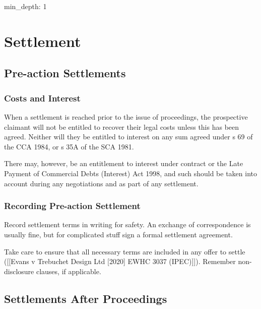 \documentclass[
]{article}
\author{}
\date{}
\newenvironment{Shaded}{}{}
\newcommand{\NormalTok}[1]{#1}
\begin{document}
{
\setcounter{tocdepth}{3}
\tableofcontents
}
\begin{Shaded}
\begin{Highlighting}[]
\NormalTok{min\_depth: 1}
\end{Highlighting}
\end{Shaded}

\hypertarget{settlement}{%
\section{Settlement}\label{settlement}}

\hypertarget{pre-action-settlements}{%
\subsection{Pre-action Settlements}\label{pre-action-settlements}}

\hypertarget{costs-and-interest}{%
\subsubsection{Costs and Interest}\label{costs-and-interest}}

When a settlement is reached prior to the issue of proceedings, the
prospective claimant will not be entitled to recover their legal costs
unless this has been agreed. Neither will they be entitled to interest
on any sum agreed under s 69 of the CCA 1984, or s 35A of the SCA 1981.

There may, however, be an entitlement to interest under contract or the
Late Payment of Commercial Debts (Interest) Act 1998, and such should be
taken into account during any negotiations and as part of any
settlement.

\hypertarget{recording-pre-action-settlement}{%
\subsubsection{Recording Pre-action
Settlement}\label{recording-pre-action-settlement}}

Record settlement terms in writing for safety. An exchange of
correspondence is usually fine, but for complicated stuff sign a formal
settlement agreement.

Take care to ensure that all necessary terms are included in any offer
to settle ({[}{[}Evans v Trebuchet Design Ltd {[}2020{]} EWHC 3037
(IPEC){]}{]}). Remember non-disclosure clauses, if applicable.

\hypertarget{settlements-after-proceedings}{%
\subsection{Settlements After
Proceedings}\label{settlements-after-proceedings}}
\end{document}
